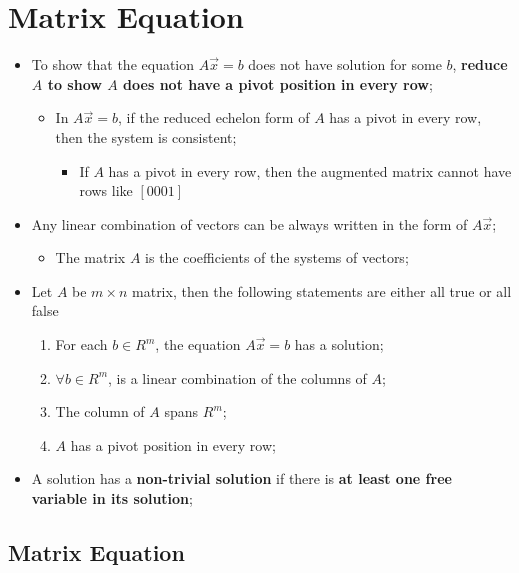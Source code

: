 \section{Matrix Equation}
  
  \begin{itemize}
    \item To show that the equation $ A \vec{x} = b $ does not have solution 
    for some $ b $, \textbf{reduce $ A $ to show $ A $ does not have a pivot
    position in every row};
    \begin{itemize}
      \item In $ A \vec{x} = b $, if the reduced echelon form of $ A $ has a pivot in 
      every row, then the system is consistent;
      \begin{itemize}
        \item If $ A $ has a pivot in every row, then the augmented matrix cannot
        have rows like $ \left[ 0 0 0 1 \right] $
      \end{itemize}
    \end{itemize}
    
    \item Any linear combination of vectors can be always written in the form of 
    $ A \vec{x} $;
    \begin{itemize}
      \item The matrix $ A $ is the coefficients of the systems of vectors;
    \end{itemize}
    
    \item Let $ A $ be $ m \times n $ matrix, then the following statements 
    are either all true or all false
    \begin{enumerate}
      \item For each $ b \in R^{m} $, the equation $ A \vec{x} = b $ has a solution;
      \item $ \forall b \in R^{m} $, is a linear combination of the columns of $ A $;
      \item The column of $ A $ spans $ R^{m} $;
      \item $ A $ has a pivot position in every row;
    \end{enumerate}
    
    \item A solution has a \textbf{non-trivial solution} if there is \textbf{at least one
    free variable in its solution};
  \end{itemize}

  \subsection{Matrix Equation}
  

